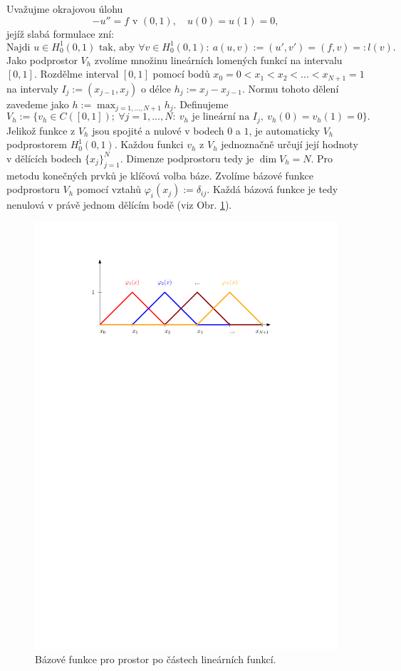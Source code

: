 Uvažujme okrajovou úlohu
\[ -u''=f \mbox{ v }(0,1),\quad u(0)=u(1)=0, \]
jejíž slabá formulace zní:
\[ \mbox{Najdi }u\in H^1_0(0,1) \mbox{ tak, aby }\forall v\in H^1_0(0,1):~a(u,v):=(u',v')=(f,v)=:l(v). \]
Jako podprostor $V_h$ zvolíme množinu lineárních lomených funkcí na intervalu $[0,1]$.
Rozdělme interval $[0,1]$ pomocí bodů $x_0=0<x_1<x_2<...<x_{N+1}=1$ na intervaly $I_j:=(x_{j-1},x_j)$ o délce $h_j:=x_j-x_{j-1}$.
Normu tohoto dělení zavedeme jako $h:=\max_{j=1,...,N+1} h_j$.
Definujeme
\[ V_h:=\{v_h\in C([0,1]);~\forall j=1,...,N:~v_h \mbox{ je lineární na }I_j,~v_h(0)=v_h(1)=0 \}. \]
Jelikož funkce z $V_h$ jsou spojité a nulové v bodech $0$ a $1$, je automaticky $V_h$ podprostorem $H^1_0(0,1)$.
Každou funkci $v_h$ z $V_h$ jednoznačně určují její hodnoty v dělících bodech $\{x_j\}_{j=1}^N$.
Dimenze podprostoru tedy je $\dim V_h=N$.
Pro metodu konečných prvků je klíčová volba báze.
Zvolíme bázové funkce podprostoru $V_h$ pomocí vztahů $\varphi_i(x_j):=\delta_{ij}$.
Každá bázová funkce je tedy nenulová v právě jednom dělícím bodě (viz Obr. \ref{fig:base_1d_lin}).
\begin{figure}[h]
\centering
\includegraphics{base_1d_lin}
\caption{Bázové funkce pro prostor po částech lineárních funkcí.}
\label{fig:base_1d_lin}
\end{figure}
